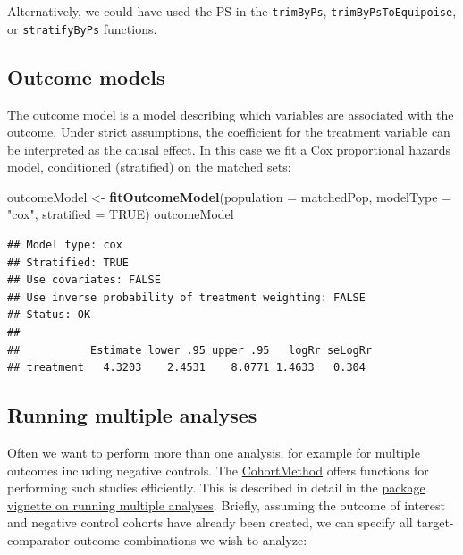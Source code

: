 \documentclass[]{book}
\newenvironment{Shaded}{\begin{snugshade}}{\end{snugshade}}
\newcommand{\DataTypeTok}[1]{\textcolor[rgb]{0.13,0.29,0.53}{#1}}
\newcommand{\KeywordTok}[1]{\textcolor[rgb]{0.13,0.29,0.53}{\textbf{#1}}}
\newcommand{\NormalTok}[1]{#1}
\newcommand{\OtherTok}[1]{\textcolor[rgb]{0.56,0.35,0.01}{#1}}
\newcommand{\StringTok}[1]{\textcolor[rgb]{0.31,0.60,0.02}{#1}}
\begin{document}
Alternatively, we could have used the PS in the \texttt{trimByPs}, \texttt{trimByPsToEquipoise}, or \texttt{stratifyByPs} functions.

\hypertarget{outcome-models}{%
\subsection{Outcome models}\label{outcome-models}}

The outcome model is a model describing which variables are associated with the outcome. Under strict assumptions, the coefficient for the treatment variable can be interpreted as the causal effect. In this case we fit a Cox proportional hazards model, conditioned (stratified) on the matched sets:

\begin{Shaded}
\begin{Highlighting}[]
\NormalTok{outcomeModel <-}\StringTok{ }\KeywordTok{fitOutcomeModel}\NormalTok{(}\DataTypeTok{population =}\NormalTok{ matchedPop,}
                                \DataTypeTok{modelType =} \StringTok{"cox"}\NormalTok{,}
                                \DataTypeTok{stratified =} \OtherTok{TRUE}\NormalTok{)}
\NormalTok{outcomeModel}
\end{Highlighting}
\end{Shaded}

\begin{verbatim}
## Model type: cox
## Stratified: TRUE
## Use covariates: FALSE
## Use inverse probability of treatment weighting: FALSE
## Status: OK
## 
##           Estimate lower .95 upper .95   logRr seLogRr
## treatment   4.3203    2.4531    8.0771 1.4633   0.304
\end{verbatim}

\hypertarget{MultipleAnalyses}{%
\subsection{Running multiple analyses}\label{MultipleAnalyses}}

Often we want to perform more than one analysis, for example for multiple outcomes including negative controls. The \href{https://ohdsi.github.io/CohortMethod/}{CohortMethod} offers functions for performing such studies efficiently. This is described in detail in the \href{https://ohdsi.github.io/CohortMethod/articles/MultipleAnalyses.html}{package vignette on running multiple analyses}. Briefly, assuming the outcome of interest and negative control cohorts have already been created, we can specify all target-comparator-outcome combinations we wish to analyze:
\end{document}
